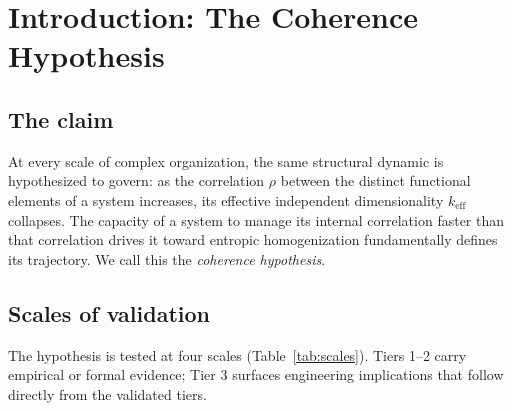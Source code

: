 \documentclass[11pt,a4paper]{article}
\begin{document}
\begin{abstract}
dynamics, civilizational coherence-collapse, and sociotechnical audit-pressure effects --- each with explicit falsification handles, pre-registered experiments, and open priors. These conjectures are not load-bearing on the validated tiers; they are included so researchers who want to test the principle at other substrates can find the formal hooks.
\end{abstract}

\tableofcontents
\vspace{1em}

\section{Introduction: The Coherence Hypothesis}
\label{sec:intro}

\subsection{The claim}
At every scale of complex organization, the same structural dynamic is hypothesized to govern: as the correlation $\rho$ between the distinct functional elements of a system increases, its effective independent dimensionality $k_{\text{eff}}$ collapses. The capacity of a system to manage its internal correlation faster than that correlation drives it toward entropic homogenization fundamentally defines its trajectory. We call this the \emph{coherence hypothesis}.

\subsection{Scales of validation}
The hypothesis is tested at four scales (Table~\ref{tab:scales}). Tiers 1--2 carry empirical or formal evidence; Tier 3 surfaces engineering implications that follow directly from the validated tiers.
\end{document}
